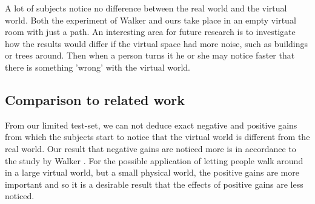 A lot of subjects notice no difference between the real world and the virtual world.
Both the experiment of Walker \cite{jwalker} and ours take place in an empty virtual room with just a path. 
An interesting area for future research is to investigate how the results would differ if the virtual space had more noise, such as buildings or trees around.
Then when a person turns it he or she may notice faster that there is something 'wrong'  with the virtual world. 

\subsection{Comparison to related work}
From our limited test-set, we can not deduce exact negative and positive gains from which the subjects start to notice that the virtual world is different from the real world.
Our result that negative gains are noticed more is in accordance to the study by Walker \cite{jwalker}.
For the possible application of letting people walk around in a large virtual world, but a small physical world, the positive gains are more important and so it is a desirable result that the effects of positive gains are less noticed.
